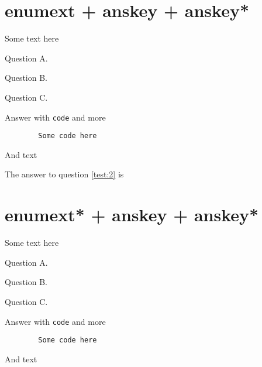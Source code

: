\documentclass{article}
\begin{document}
\section{enumext + anskey + anskey*}

Some text here

\begin{enumext}[save-ans=test,save-sep={ },save-ref = true]
  \item Question A. 
  \item Question B. 
  \item Question C.
    \begin{anskey*}
    Answer with \verb+code+ and more
      \begin{verbatim}
        Some code here
      \end{verbatim}
    And text
    \end{anskey*}
\end{enumext}

The answer to question \ref{test:2} is 


\section{enumext* + anskey + anskey*}

Some text here

\begin{enumext*}[save-ans=test-2,save-sep={ },save-ref = true]
  \item Question A. 
  \item Question B. 
  \item Question C.
    \begin{anskey*}
    Answer with \verb+code+ and more
      \begin{verbatim}
        Some code here
      \end{verbatim}
    And text
    \end{anskey*}
\end{enumext*}

\end{document}
